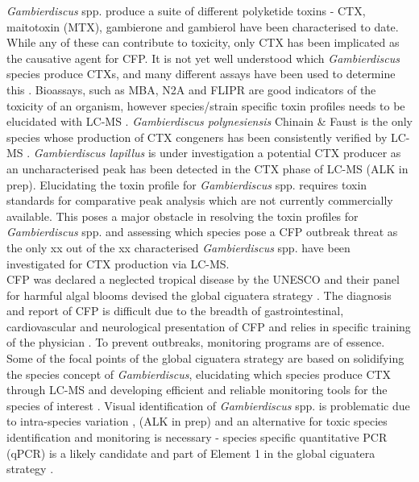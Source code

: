 \documentclass[12pt]{article}
\begin{document}
\emph{Gambierdiscus} spp. produce a suite of different polyketide toxins - CTX, maitotoxin (MTX), gambierone and gambierol have been characterised to date. While any of these can contribute to toxicity, only CTX has been implicated as the causative agent for CFP. It is not yet well understood which \textit{Gambierdiscus} species produce CTXs, and many different assays have been used to determine this \citep{globalcig}. Bioassays, such as MBA, N2A and FLIPR are good indicators of the toxicity of an organism, however species/strain specific toxin profiles needs to be elucidated with LC-MS \citep{diogened2014chemistry}. \textit{Gambierdiscus polynesiensis} Chinain \& Faust is the only species whose production of CTX congeners has been consistently verified by LC-MS \citep{chinain2010growth}. \emph{Gambierdiscus lapillus} is under investigation a potential CTX producer as an uncharacterised peak has been detected in the CTX phase of LC-MS (ALK in prep). Elucidating the toxin profile for \textit{Gambierdiscus} spp. requires toxin standards for comparative peak analysis which are not currently commercially available. This poses a major obstacle in resolving the toxin profiles for \textit{Gambierdiscus} spp. and assessing which species pose a CFP outbreak threat as the only xx out of the xx characterised \textit{Gambierdiscus} spp. have been investigated for CTX production via LC-MS. \\

CFP was declared a neglected tropical disease by the UNESCO and their panel for harmful algal blooms devised the global ciguatera strategy \citep{globalcig}.
The diagnosis and report of CFP is difficult due to the breadth of gastrointestinal, cardiovascular and neurological presentation of CFP and relies in specific training of the physician \citep{sims1987theoretical}. 
To prevent outbreaks, monitoring programs are of essence. Some of the focal points of the global ciguatera strategy are based on solidifying the species concept of \emph{Gambierdiscus}, elucidating which species produce CTX through LC-MS and developing efficient and reliable monitoring tools for the species of interest \citep{globalcig}. Visual identification of \emph{Gambierdiscus} spp. is problematic due to intra-species variation \citep{kohli2014high}, (ALK in prep) and an alternative for toxic species identification and monitoring is necessary - species specific quantitative PCR (qPCR) is a likely candidate and part of Element 1 in the global ciguatera strategy \citep{globalcig}. \\
\end{document}
